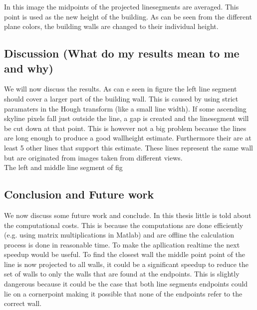\documentclass[10pt]{article}
\begin{document}
In this image the midpoints of the projected linesegments are averaged. This
point is used as the new height of the building. As can be seen from the
different plane colors, the building walls are changed to their individual height.

\subsection{Discussion (What do my results mean to me and why)}
We will now discuss the results. As can e seen in figure
the left line segment should cover a larger part of the building wall. This is caused by using strict paramaters in the Hough transform (like a small line width).
If some ascending skyline pixels fall just outside the line, a gap is created and the linesegment will be cut down at that point. This is however not a big problem because the lines are long enough to produce a good wallheight estimate. Furthermore their are at least 5 other lines that support this estimate. These lines represent the same wall but are originated from images taken from different views. \\
The left and middle line segment of fig





\subsection{Conclusion and Future work}
We now discuss some future work and conclude.
In this thesis little is told about the computational costs. This is because the computations are done efficiently (e.g. using matrix multiplications in Matlab) and are offline the calculation process is done in reasonable time. To make the apllication realtime the next speedup would be useful.
To find the closest wall the middle point point of the line is now projected to all walls, it could be a significant speedup to reduce the set of walls to only the walls that are found at the endpoints. This is slightly dangerous because it could be the case that both line segments endpoints could lie on a cornerpoint making it possible that none of the endpoints refer to the correct wall.\\
\end{document}
